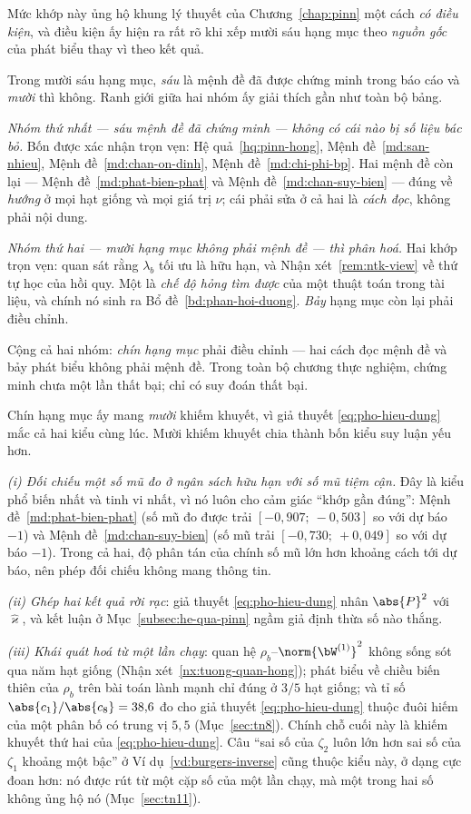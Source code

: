 Mức khớp này ủng hộ khung lý thuyết của Chương~\ref{chap:pinn} một cách
\emph{có điều kiện}, và điều kiện ấy hiện ra rất rõ khi xếp mười sáu hạng mục
theo \emph{nguồn gốc} của phát biểu thay vì theo kết quả.

Trong mười sáu hạng mục, \emph{sáu} là mệnh đề đã được chứng minh trong báo cáo
và \emph{mười} thì không. Ranh giới giữa hai nhóm ấy giải thích gần như toàn bộ
bảng.

\emph{Nhóm thứ nhất --- sáu mệnh đề đã chứng minh --- không có cái nào bị số
liệu bác bỏ.} Bốn được xác nhận trọn vẹn: Hệ quả~\ref{hq:pinn-hong},
Mệnh đề~\ref{md:san-nhieu}, Mệnh đề~\ref{md:chan-on-dinh},
Mệnh đề~\ref{md:chi-phi-bp}. Hai mệnh đề còn lại ---
Mệnh đề~\ref{md:phat-bien-phat} và Mệnh đề~\ref{md:chan-suy-bien} --- đúng về
\emph{hướng} ở mọi hạt giống và mọi giá trị $\nu$; cái phải sửa ở cả hai là
\emph{cách đọc}, không phải nội dung.

\emph{Nhóm thứ hai --- mười hạng mục không phải mệnh đề --- thì phân hoá.} Hai
khớp trọn vẹn: quan sát rằng $\lambda_b$ tối ưu là hữu hạn, và
Nhận xét~\ref{rem:ntk-view} về thứ tự học của hồi quy. Một là \emph{chế độ hỏng
tìm được} của một thuật toán trong tài liệu, và chính nó sinh ra
Bổ đề~\ref{bd:phan-hoi-duong}. \emph{Bảy} hạng mục còn lại phải điều chỉnh.

Cộng cả hai nhóm: \emph{chín hạng mục} phải điều chỉnh --- hai cách đọc mệnh đề
và bảy phát biểu không phải mệnh đề. Trong toàn bộ chương thực nghiệm, chứng
minh chưa một lần thất bại; chỉ có suy đoán thất bại.

Chín hạng mục ấy mang \emph{mười} khiếm khuyết, vì giả thuyết
\eqref{eq:pho-hieu-dung} mắc cả hai kiểu cùng lúc. Mười khiếm khuyết chia thành
bốn kiểu suy luận yếu hơn.

\emph{(i) Đối chiếu một số mũ đo ở ngân sách hữu hạn với số mũ tiệm cận.} Đây là
kiểu phổ biến nhất và tinh vi nhất, vì nó luôn cho cảm giác ``khớp gần đúng'':
Mệnh đề~\ref{md:phat-bien-phat} (số mũ đo được trải $[-0{,}907;\ -0{,}503]$ so
với dự báo $-1$) và Mệnh đề~\ref{md:chan-suy-bien} (số mũ trải
$[-0{,}730;\ +0{,}049]$ so với dự báo $-1$). Trong cả hai, độ phân tán của chính
số mũ lớn hơn khoảng cách tới dự báo, nên phép đối chiếu không mang thông tin.

\emph{(ii) Ghép hai kết quả rời rạc}: giả thuyết \eqref{eq:pho-hieu-dung} nhân
$\abs{P}^2$ với $\widehat{\varkappa}$, và kết luận ở Mục~\ref{subsec:he-qua-pinn}
ngầm giả định thừa số nào thắng.

\emph{(iii) Khái quát hoá từ một lần chạy}: quan hệ $\rho_b$--$\norm{\bW^{(1)}}^2$
không sống sót qua năm hạt giống (Nhận xét~\ref{nx:tuong-quan-hong}); phát biểu
về chiều biến thiên của $\rho_b$ trên bài toán lành mạnh chỉ đúng ở $3/5$ hạt
giống; và tỉ số $\abs{c_1}/\abs{c_8} = 38{,}6$ đo cho
giả thuyết \eqref{eq:pho-hieu-dung} thuộc đuôi hiếm của một phân bố có trung vị
$5{,}5$ (Mục~\ref{sec:tn8}). Chính chỗ cuối này là khiếm khuyết thứ hai của
\eqref{eq:pho-hieu-dung}. Câu ``sai số của $\zeta_2$ luôn lớn hơn sai số của
$\zeta_1$ khoảng một bậc'' ở Ví dụ~\ref{vd:burgers-inverse} cũng thuộc kiểu này,
ở dạng cực đoan hơn: nó được rút từ một cặp số của một lần chạy, mà một trong hai
số không ủng hộ nó (Mục~\ref{sec:tn11}).

